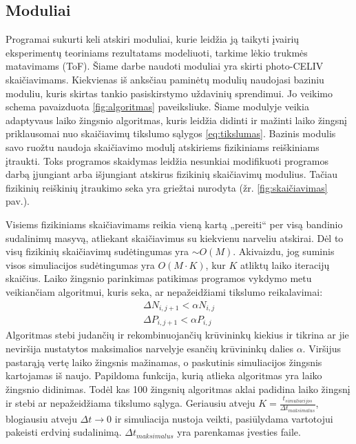 \subsection{Moduliai}
Programai sukurti keli atskiri moduliai, kurie leidžia ją taikyti įvairių eksperimentų teoriniams rezultatams modeliuoti, tarkime lėkio trukmės matavimams (ToF). Šiame darbe naudoti moduliai yra skirti photo-CELIV skaičiavimams. Kiekvienas iš anksčiau paminėtų modulių naudojasi baziniu moduliu, kuris skirtas tankio pasiskirstymo uždavinių sprendimui. Jo veikimo schema pavaizduota  \ref{fig:algoritmas} paveiksliuke. Šiame modulyje veikia adaptyvaus laiko žingsnio algoritmas, kuris leidžia didinti ir mažinti laiko žingsnį priklausomai nuo skaičiavimų tikslumo sąlygos \eqref{eq:tikslumas}. Bazinis modulis savo ruožtu naudoja skaičiavimo modulį atskiriems fizikiniams reiškiniams įtraukti. Toks programos skaidymas leidžia nesunkiai modifikuoti programos darbą įjungiant arba išjungiant atskirus fizikinių skaičiavimų modulius. Tačiau fizikinių reiškinių įtraukimo seka yra griežtai nurodyta (žr. \ref{fig:skaičiavimas} pav.).

Visiems fizikiniams skaičiavimams reikia vieną kartą „pereiti“ per visą bandinio sudalinimų masyvą, atliekant skaičiavimus su kiekvienu narveliu atskirai. Dėl to visų fizikinių skaičiavimų sudėtingumas yra \(\sim O(M)\). Akivaizdu, jog suminis visos simuliacijos sudėtingumas yra \(O(M \cdot K)\), kur \(K\) atliktų laiko iteracijų skaičius. Laiko žingsnio parinkimas patikimas programos vykdymo metu veikiančiam algoritmui, kuris seka, ar nepažeidžiami tikslumo reikalavimai:
\begin{equation} \label{eq:tikslumas}
\begin{array}{c}
\Delta N_{i,j+1} < \alpha N_{i,j} \\
\Delta P_{i,j+1} < \alpha P_{i,j}
\end{array}
\end{equation}
Algoritmas stebi judančių ir rekombinuojančių krūvininkų kiekius ir tikrina ar jie neviršija nustatytos maksimalios narvelyje esančių krūvininkų dalies \(\alpha\). Viršijus pastarąją vertę laiko žingsnis mažinamas, o paskutinis simuliacijos žingsnis kartojamas iš naujo. Papildoma funkcija, kurią atlieka algoritmas yra laiko žingsnio didinimas. Todėl kas 100 žingsnių algoritmas aklai padidina laiko žingsnį ir stebi ar nepažeidžiama tikslumo sąlyga.
Geriausiu atveju \(K= \frac{t_{simuliacijos}}{\Delta t_{maksimalus}}\), blogiausiu atveju \(\Delta t \rightarrow 0 \) ir simuliacija nustoja veikti, pasiūlydama vartotojui pakeisti erdvinį sudalinimą. \( \Delta t_{maksimalus} \) yra parenkamas įvesties faile.

